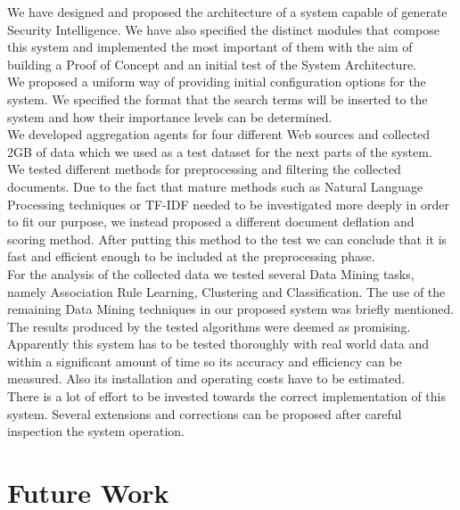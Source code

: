 \documentclass[12pt]{article}
\begin{document}
We have designed and proposed the architecture of a system capable of generate Security Intelligence. We have also specified the distinct modules that compose this system and implemented the most important of them with the aim of building a Proof of Concept and an initial test of the System Architecture. 
\hfill \break\\
We proposed a uniform way of providing initial configuration options for the system. We specified the format that the search terms will be inserted to the system and how their importance levels can be determined. 
\hfill \break\\
We developed aggregation agents for four different Web sources and collected 2GB of data which we used as a test dataset for the next parts of the system. 
\hfill \break\\
We tested different methods for preprocessing and filtering the collected documents. Due to the fact that mature methods such as Natural Language Processing techniques or TF-IDF needed to be investigated more deeply in order to fit our purpose, we instead proposed a different document deflation and scoring method. After putting this method to the test we can conclude that it is fast and efficient enough to be included at the preprocessing phase. 
\hfill \break\\
For the analysis of the collected data we tested several Data Mining tasks, namely Association Rule Learning, Clustering and Classification. The use of the remaining Data Mining techniques in our proposed system was briefly mentioned. The results produced by the tested algorithms were deemed as promising. 
\hfill \break\\
Apparently this system has to be tested thoroughly with real world data and within a significant amount of time so its accuracy and efficiency can be measured. Also its installation and operating costs have to be estimated. 
\hfill \break\\
There is a lot of effort to be invested towards the correct implementation of this system. Several extensions and corrections can be proposed after careful inspection the system operation. 


\newpage
\section{Future Work} 
\end{document}
